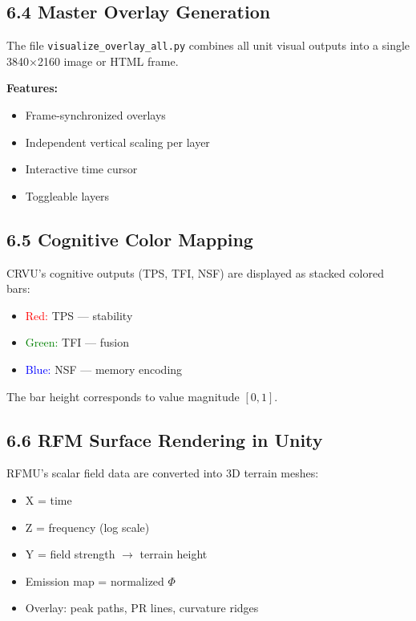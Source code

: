 \documentclass[10pt]{article}
\begin{document}
\subsection*{6.4 Master Overlay Generation}

The file \texttt{visualize_overlay_all.py} combines all unit visual outputs into a single 3840×2160 image or HTML frame.

\textbf{Features:}

\begin{itemize}
    \item Frame-synchronized overlays
    \item Independent vertical scaling per layer
    \item Interactive time cursor
    \item Toggleable layers
\end{itemize}

\subsection*{6.5 Cognitive Color Mapping}

CRVU’s cognitive outputs (TPS, TFI, NSF) are displayed as stacked colored bars:

\begin{itemize}
    \item \textcolor{red}{Red:} TPS — stability
    \item \textcolor{green}{Green:} TFI — fusion
    \item \textcolor{blue}{Blue:} NSF — memory encoding
\end{itemize}

The bar height corresponds to value magnitude $[0,1]$.

\subsection*{6.6 RFM Surface Rendering in Unity}

RFMU’s scalar field data are converted into 3D terrain meshes:

\begin{itemize}
    \item X = time
    \item Z = frequency (log scale)
    \item Y = field strength $\rightarrow$ terrain height
    \item Emission map = normalized $\Phi$
    \item Overlay: peak paths, PR lines, curvature ridges
\end{itemize}
\end{document}
